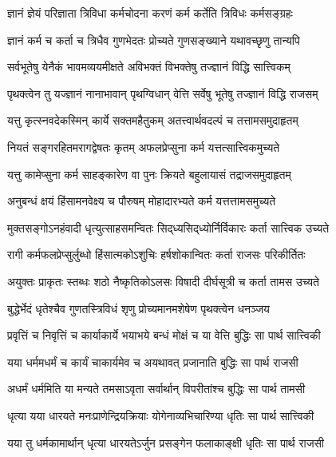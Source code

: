 \twolineshloka
{ज्ञानं ज्ञेयं परिज्ञाता त्रिविधा कर्मचोदना}
{करणं कर्म कर्तेति त्रिविधः कर्मसङ्ग्रहः}%

\twolineshloka
{ज्ञानं कर्म च कर्ता च त्रिधैव गुणभेदतः}
{प्रोच्यते गुणसङ्ख्याने यथावच्छृणु तान्यपि}%

\twolineshloka
{सर्वभूतेषु येनैकं भावमव्ययमीक्षते}
{अविभक्तं विभक्तेषु तज्ज्ञानं विद्धि सात्त्विकम्}%

\twolineshloka
{पृथक्त्वेन तु यज्ज्ञानं नानाभावान् पृथग्विधान्}
{वेत्ति सर्वेषु भूतेषु तज्ज्ञानं विद्धि राजसम्}%

\twolineshloka
{यत्तु कृत्स्नवदेकस्मिन् कार्ये सक्तमहैतुकम्}
{अतत्त्वार्थवदल्पं च तत्तामसमुदाहृतम्}%

\twolineshloka
{नियतं सङ्गरहितमरागद्वेषतः कृतम्}
{अफलप्रेप्सुना कर्म यत्तत्सात्त्विकमुच्यते}%

\twolineshloka
{यत्तु कामेप्सुना कर्म साहङ्कारेण वा पुनः}
{क्रियते बहुलायासं तद्राजसमुदाहृतम्}%

\twolineshloka
{अनुबन्धं क्षयं हिंसामनवेक्ष्य च पौरुषम्}
{मोहादारभ्यते कर्म यत्तत्तामसमुच्यते}%

\twolineshloka
{मुक्तसङ्गोऽनहंवादी धृत्युत्साहसमन्वितः}
{सिद्‌ध्यसिद्‌ध्योर्निर्विकारः कर्ता सात्त्विक उच्यते}%

\twolineshloka
{रागी कर्मफलप्रेप्सुर्लुब्धो हिंसात्मकोऽशुचिः}
{हर्षशोकान्वितः कर्ता राजसः परिकीर्तितः}%

\twolineshloka
{अयुक्तः प्राकृतः स्तब्धः शठो नैष्कृतिकोऽलसः}
{विषादी दीर्घसूत्री च कर्ता तामस उच्यते}%

\twolineshloka
{बुद्धेर्भेदं धृतेश्चैव गुणतस्त्रिविधं शृणु}
{प्रोच्यमानमशेषेण पृथक्त्वेन धनञ्जय}%

\twolineshloka
{प्रवृत्तिं च निवृत्तिं च कार्याकार्ये भयाभये}
{बन्धं मोक्षं च या वेत्ति बुद्धिः सा पार्थ सात्त्विकी}%

\twolineshloka
{यया धर्ममधर्मं च कार्यं चाकार्यमेव च}
{अयथावत् प्रजानाति बुद्धिः सा पार्थ राजसी}%

\twolineshloka
{अधर्मं धर्ममिति या मन्यते तमसाऽवृता}
{सर्वार्थान् विपरीतांश्च बुद्धिः सा पार्थ तामसी}%

\twolineshloka
{धृत्या यया धारयते मनःप्राणेन्द्रियक्रियाः}
{योगेनाव्यभिचारिण्या धृतिः सा पार्थ सात्त्विकी}%

\twolineshloka
{यया तु धर्मकामार्थान् धृत्या धारयतेऽर्जुन}
{प्रसङ्गेन फलाकाङ्क्षी धृतिः सा पार्थ राजसी}%

